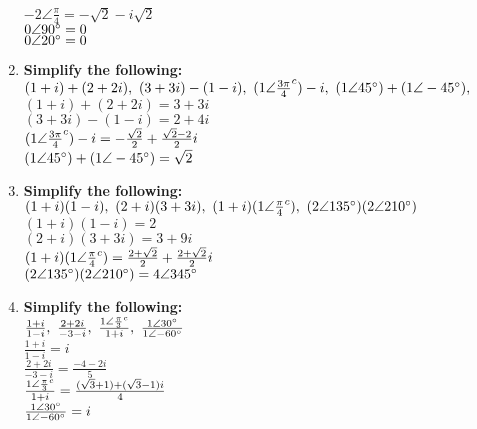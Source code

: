 \begin{enumerate}
\tab \tab $-2\angle\frac{\pi}{4} = -\sqrt{2} - i\sqrt{2}$\\

\tab \tab $0\angle90^\circ = 0$\\

\tab \tab $0\angle20^\circ = 0$\\

\item{\bf Simplify the following: \\ $(1+i)+(2+2i),\ (3+3i)-(1-i),\ (1\angle\frac{3\pi}{4}\rad)-i,\  (1\angle45\degree)+(1\angle-45\degree), $}\\

\tab \tab $(1+i)+(2+2i) = 3 + 3i$\\

\tab \tab $(3+3i)-(1-i) = 2 + 4i$\\

\tab \tab $(1\angle\frac{3\pi}{4}^c)-i = -\frac{\sqrt{2}}{2} + \frac{\sqrt{2}-2}{2}i$\\

\tab \tab $(1\angle45^\circ)+(1\angle-45^\circ) = \sqrt{2}$\\

\item{\bf Simplify the following: \\ $(1+i)(1-i),\ (2+i)(3+3i),\ (1+i)(1\angle\frac{\pi}{4}\rad),\ (2\angle135\degree)(2\angle210\degree)$}\\

\tab \tab $(1+i)(1-i) = 2$\\

\tab \tab $(2+i)(3+3i) = 3 + 9i$\\

\tab \tab $(1+i)(1\angle\frac{\pi}{4}^c) = \frac{2+\sqrt{2}}{2} + \frac{2+\sqrt{2}}{2}i$\\

\tab \tab $(2\angle135^\circ)(2\angle210^\circ) = 4\angle345^\circ$\\

\item{\bf Simplify the following: \\ $\frac{1+i}{1-i},\ \frac{2+2i}{-3-i},\ \frac{1\angle\frac{\pi}{3}\rad}{1+i},\ \frac{1\angle30\degree}{1\angle-60\degree}$}\\

\tab \tab $\frac{1+i}{1-i} = i$\\

\tab \tab $\frac{2+2i}{-3-i} = \frac{-4-2i}{5}$\\

\tab \tab $\frac{1\angle\frac{\pi}{3}^c}{1+i} = \frac{(\sqrt{3} + 1) + (\sqrt{3} - 1)i}{4}$\\

\tab \tab $\frac{1\angle30^\circ}{1\angle-60^\circ} = i$\\

\end{enumerate}

